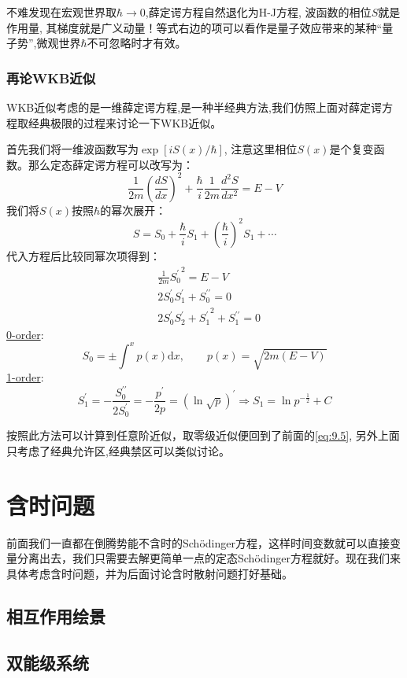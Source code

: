 \documentclass[a4paper,zihao=-4,linespread=1]{ctexrep}
\begin{document}
	不难发现在宏观世界取$\hbar\to 0$,薛定谔方程自然退化为H-J方程, 波函数的相位$S$就是作用量, 其梯度就是广义动量！等式右边的项可以看作是量子效应带来的某种“量子势”,微观世界$\hbar$不可忽略时才有效。
	\subsection*{再论WKB近似}
	WKB近似考虑的是一维薛定谔方程,是一种半经典方法,我们仿照上面对薛定谔方程取经典极限的过程来讨论一下WKB近似。
	
	首先我们将一维波函数写为$\exp\left[iS(x)/\hbar\right]$, 注意这里相位$S(x)$是个复变函数。那么定态薛定谔方程可以改写为：
	\begin{equation}
		\frac{1}{2m}\left(\frac{dS}{dx}\right)^2+\frac{\hbar}{i}\frac{1}{2m}\frac{d^2 S}{dx^2}=E-V
	\end{equation}
	我们将$S(x)$按照$\hbar$的幂次展开：
	\[S=S_0+\frac{\hbar}{i}S_1+\left(\frac{\hbar}{i}\right)^2S_1+\cdots\]
	代入方程后比较同幂次项得到：
	\begin{align}
		&\frac{1}{2m}{S_0^\prime}^2=E-V\\
		&2S_0^\prime S_1^\prime+S_0^{\prime\prime}=0\\
		&2S_0^\prime S_2^\prime+{S_1^\prime}^2+S_1^{\prime\prime}=0
	\end{align}
	\underline{0-order}:\[S_0=\pm\int^xp(x) \mathrm{d}x,\qquad p(x)=\sqrt{2m(E-V)}\]
	\underline{1-order}:\[S^\prime_1=-\frac{S_0^{\prime\prime}}{2S_0^\prime}=-\frac{p^\prime}{2p}=\left(\ln \sqrt{p}\right)^\prime\Rightarrow S_1=\ln p^{-\frac{1}{2}}+C\]
	
	
	按照此方法可以计算到任意阶近似，取零级近似便回到了前面的\ref{eq:9.5}, 另外上面只考虑了经典允许区,经典禁区可以类似讨论。
	\chapter{含时问题}
	前面我们一直都在倒腾势能不含时的Sch\"{o}dinger方程，这样时间变数就可以直接变量分离出去，我们只需要去解更简单一点的定态Sch\"{o}dinger方程就好。现在我们来具体考虑含时问题，并为后面讨论含时散射问题打好基础。
	
	\section{相互作用绘景}
	
	\section{双能级系统}
	
\end{document}
